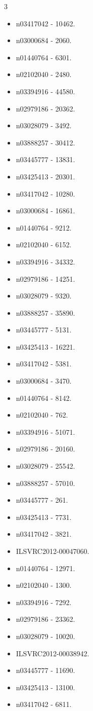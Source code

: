 \begin{multicols}{3}
\begin{itemize}
\item n03417042 - 10462.
\item n03000684 - 2060.
\item n01440764 - 6301.
\item n02102040 - 2480.
\item n03394916 - 44580.
\item n02979186 - 20362.
\item n03028079 - 3492.
\item n03888257 - 30412.
\item n03445777 - 13831.
\item n03425413 - 20301.
\item n03417042 - 10280.
\item n03000684 - 16861.
\item n01440764 - 9212.
\item n02102040 - 6152.
\item n03394916 - 34332.
\item n02979186 - 14251.
\item n03028079 - 9320.
\item n03888257 - 35890.
\item n03445777 - 5131.
\item n03425413 - 16221.
\item n03417042 - 5381.
\item n03000684 - 3470.
\item n01440764 - 8142.
\item n02102040 - 762.
\item n03394916 - 51071.
\item n02979186 - 20160.
\item n03028079 - 25542.
\item n03888257 - 57010.
\item n03445777 - 261.
\item n03425413 - 7731.
\item n03417042 - 3821.
\item ILSVRC2012-00047060.
\item n01440764 - 12971.
\item n02102040 - 1300.
\item n03394916 - 7292.
\item n02979186 - 23362.
\item n03028079 - 10020.
\item ILSVRC2012-00038942.
\item n03445777 - 11690.
\item n03425413 - 13100.
\item n03417042 - 6811.

\end{itemize}
\end{multicols}

